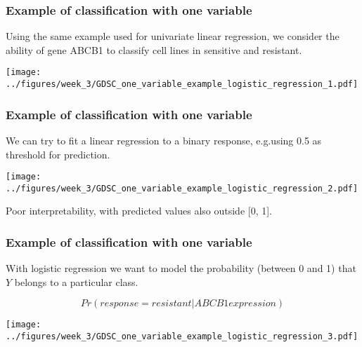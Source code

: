 \documentclass[notes]{beamer}          %
\begin{document}
\begin{frame}
\frametitle{Example of classification with one variable}

Using the same example used for univariate linear regression, we consider the ability of gene ABCB1 to classify cell lines in sensitive and resistant.

\begin{center}
\texttt{[image: ../figures/week\_3/GDSC\_one\_variable\_example\_logistic\_regression\_1.pdf]}
\end{center}

\end{frame}

\begin{frame}
\frametitle{Example of classification with one variable}

We can try to fit a linear regression to a binary response, e.g.using 0.5 as threshold for prediction.

\begin{center}
\texttt{[image: ../figures/week\_3/GDSC\_one\_variable\_example\_logistic\_regression\_2.pdf]}
\end{center}

Poor interpretability, with predicted values also outside [0, 1].

\end{frame}

\begin{frame}
\frametitle{Example of classification with one variable}

With logistic regression we want to model the probability (between 0 and 1) that $Y$ belongs to a particular class.

\begin{equation*}
Pr(response = resistant|ABCB1expression)
\end{equation*}


\begin{center}
\texttt{[image: ../figures/week\_3/GDSC\_one\_variable\_example\_logistic\_regression\_3.pdf]}
\end{center}

\end{frame}
\end{document}
